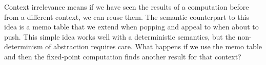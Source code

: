 Context irrelevance means if we have seen the results of a computation before from a different context, we can reuse them.
%
The semantic counterpart to this idea is a memo table that we extend when popping and appeal to when about to push.
%
This simple idea works well with a deterministic semantics, but the non-determinism of abstraction requires care.
%
%
What happens if we use the memo table and then the fixed-point computation finds another result for that context?
%
